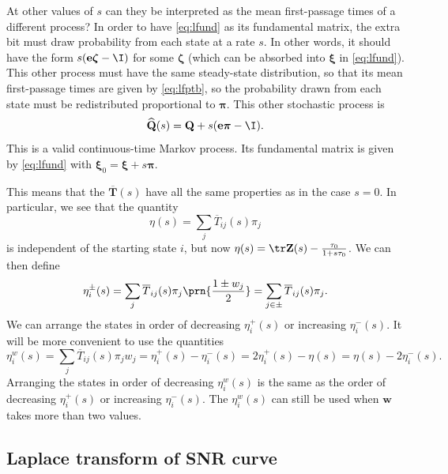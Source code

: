 \documentclass[12pt]{article}
\newcommand{\onev}{\mathbf{e}}
\newcommand{\MMm}{Q}
\newcommand{\MM}{\mathbf{\MMm}}
\newcommand{\eqm}{\pi}
\newcommand{\eq}{\boldsymbol{\eqm}}
\newcommand{\fptm}{T}
\newcommand{\fpt}{\mathbf{\fptm}}
\newcommand{\fptbm}{\overline{\fptm}}
\newcommand{\fptb}{\overline{\fpt}}
\newcommand{\fundm}{Z}
\newcommand{\fund}{\mathbf{\fundm}}
\newcommand{\arowm}{\xi}
\newcommand{\arow}{\boldsymbol{\arowm}}
\newcommand{\etwm}{\eta^w}
\newcommand{\wm}{w}
\newcommand{\w}{\mathbf{\wm}}
\newcommand{\shift}[1]{\widehat{#1}}
\begin{document}
At other values of \(s\) can they be interpreted as the mean first-passage times of a different process?
In order to have \cref{eq:lfund} as its fundamental matrix, the extra bit must draw probability from each state at a rate \(s\).
In other words, it should have the form \(s(\onev \boldsymbol{\zeta} - \I)\) for some \(\boldsymbol{\zeta} \) 
(which can be absorbed into \(\arow\) in \cref{eq:lfund}).
This other process must have the same steady-state distribution, so that its mean first-passage times are given by \cref{eq:lfptb}, so the probability drawn from each state must be redistributed proportional to \(\eq\).
This other stochastic process is
%
\begin{equation}\label{eq:lshift}
  \shift{\MM}(s) = \MM + s (\onev \eq - \I).
\end{equation}
%
This is a valid continuous-time Markov process.
Its fundamental matrix is given by \cref{eq:lfund} with \( \arow_0 = \arow + s \eq \).

This means that the \( \fptb(s) \) have all the same properties as in the case $s=0$.
In particular, we see that the quantity
%
\begin{equation}\label{eq:lkemeny}
  \eta(s) = \sum_j \fptbm_{ij}(s) \eqm_j
\end{equation}
%
is independent of the starting state $i$, but now $\eta(s) = \tr\fund(s) - \frac{\tau_0}{1 + s \tau_0}$.
We can then define
%
\begin{equation}\label{eq:lpmixtime}
  \eta^{\pm}_i(s) = \sum_j \fptbm_{ij}(s) \eqm_j \prn{\frac{1 \pm \wm_j}{2}} 
      =  \sum_{j\in \pm} \fptbm_{ij}(s) \eqm_j.
\end{equation}
%
We can arrange the states in order of decreasing $\eta^{+}_i(s)$ or increasing $\eta^{-}_i(s)$.
It will be more convenient to use the quantities
%
\begin{equation}\label{eq:lwpmixtime}
  \etwm_i(s) = \sum_j \fptbm_{ij}(s)\eqm_j \wm_j
    = \eta^+_i(s) - \eta^-_i(s) 
    = 2\eta^+_i(s) - \eta(s) 
    = \eta(s) - 2\eta^-_i(s) .
\end{equation}
%
Arranging the states in order of decreasing $\etwm_i(s)$ is the same as the order of decreasing $\eta^{+}_i(s)$ or increasing $\eta^{-}_i(s)$.
The $\etwm_i(s)$ can still be used when $\w$ takes more than two values.


\subsection{Laplace transform of SNR curve}\label{sec:laplaceSNR}
\end{document}
